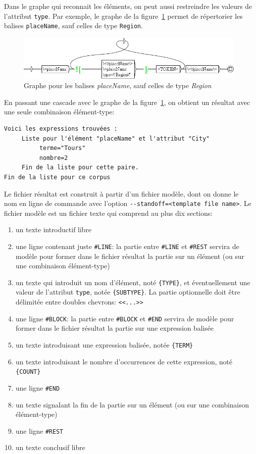 \noindent Dans le graphe qui reconnait les éléments, on peut aussi restreindre les valeurs de
l'attribut \verb$type$. Par exemple, le graphe de la figure~\ref{fig-placeNameHorsRegionStandoff}
permet de répertorier les balises \verb$placeName$, sauf celles de type \verb$Region$.

\begin{figure}[!htb]
  \centering
  \includegraphics[width=15cm]{resources/img/placeNameHorsRegionStandoff.png}
  \caption{Graphe pour les balises \emph{placeName}, sauf celles de type \emph{Region}}
  \label{fig-placeNameHorsRegionStandoff}
\end{figure}

\noindent En passant une cascade avec le graphe de la figure~\ref{fig-placeNameHorsRegionStandoff},
on obtient un résultat avec une seule combinaison élément-type:
\begin{verbatim}
Voici les expressions trouvées :
     Liste pour l'élément "placeName" et l'attribut "City" 
          terme="Tours" 
          nombre=2 
     Fin de la liste pour cette paire.
Fin de la liste pour ce corpus
\end{verbatim}

\noindent Le fichier résultat est construit à partir d'un fichier modèle, dont on donne le nom en
ligne de commande avec l'option \verb$--standoff=<template file name>$.
Le fichier modèle est un fichier texte qui comprend au plus dix sections:

\begin{enumerate}
\item un texte introductif libre
\item une ligne contenant juste \verb$#LINE$: la partie entre \verb$#LINE$ et \verb$#REST$ servira
de modèle pour former dans le fichier résultat la partie sur un élément (ou sur une combinaison
élément-type)
\item un texte qui introduit un nom d'élément, noté \verb${TYPE}$, et éventuellement une valeur de
l'attribut \verb$type$, notée \verb${SUBTYPE}$. La partie optionnelle doit être délimitée entre
doubles chevrons: \verb$<<...>>$
\item une ligne \verb$#BLOCK$: la partie entre \verb$#BLOCK$ et \verb$#END$ servira de modèle
pour former dans le fichier résultat la partie sur une expression balisée
\item un texte introduisant une expression balisée, notée \verb${TERM}$
\item un texte introduisant le nombre d'occurrences de cette expression, noté \verb${COUNT}$
\item une ligne \verb$#END$
\item un texte signalant la fin de la partie sur un élément (ou sur une combinaison élément-type)
\item une ligne \verb$#REST$
\item un texte conclusif libre
\end{enumerate}

